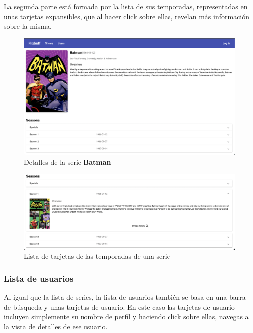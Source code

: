 La segunda parte está formada por la lista de sus temporadas, representadas en unas tarjetas expansibles, que al hacer
click sobre ellas, revelan más información sobre la misma. \\

\begin{figure}[H]
    \centering	
        \includegraphics[scale=0.25]{img/show-details.png}
    \caption{ Detalles de la serie \textbf{Batman} }\label{fig:show-details}
\end{figure}

\begin{figure}[H]
    \centering	
        \includegraphics[scale=0.25]{img/expanded-season.png}
    \caption{ Lista de tarjetas de las temporadas de una serie }\label{fig:expanded-season}
\end{figure}

\subsubsection{Lista de usuarios}
Al igual que la lista de series, la lista de usuarios también se basa en una barra de búsqueda y unas tarjetas de
usuario. En este caso las tarjetas de usuario incluyen simplemente su nombre de perfil y haciendo click sobre ellas,
navegas a la vista de detalles de ese usuario.\\

